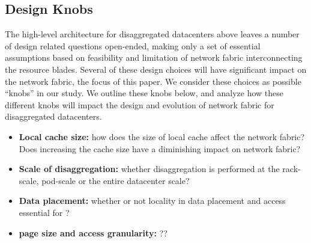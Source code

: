 \subsection{Design Knobs}
\label{ssec:assumptions}
The high-level architecture for disaggregated datacenters above leaves a number of design related questions open-ended, making only a set of essential assumptions based on feasibility and limitation of network fabric interconnecting the resource blades. Several of these design choices will have significant impact on the network fabric, the focus of this paper. We consider these choices as possible ``knobs'' in our study. We outline these knobs below, and analyze how these different knobs will impact the design and evolution of network fabric for disaggregated datacenters.

\begin{itemize}[leftmargin=*]
	\itemsep0em
	\item {\bf Local cache size:} how does the size of local cache affect the network fabric? Does increasing the cache size have a diminishing impact on network fabric?
	\item {\bf Scale of disaggregation:} whether disaggregation is performed at the rack-scale, pod-scale or the entire datacenter scale?
	\item {\bf Data placement:} whether or not locality in data placement and access essential for \dis?
	\item {\bf page size and access granularity:} ??
\end{itemize} 

